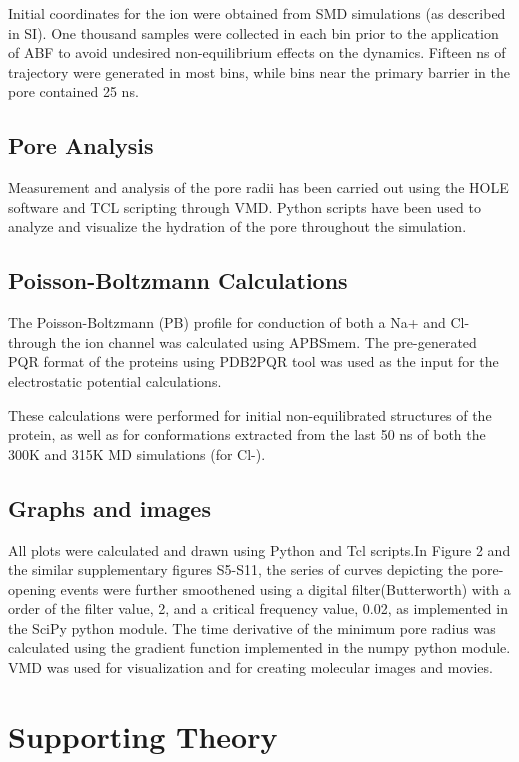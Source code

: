 \documentclass[9pt,onecolumn,oneside,lineno]{pnas-new}
\begin{document}
Initial coordinates for the ion were obtained from SMD simulations (as described in SI). One thousand samples were collected in each bin prior to the application of ABF  to avoid undesired non-equilibrium effects on the dynamics. Fifteen ns of trajectory were generated in most bins, while bins near the primary barrier in the pore contained 25 ns. 

\subsection*{Pore Analysis} Measurement and analysis of the pore radii has been carried out using the HOLE software \cite{Smart1996} and TCL scripting through VMD\cite{Humphrey1996a}. Python scripts have been used to analyze and visualize the hydration of the pore throughout the simulation. 

\subsection*{Poisson-Boltzmann Calculations} The Poisson-Boltzmann (PB) profile for conduction of both a Na+ and Cl- through the ion channel was calculated using APBSmem\cite{Callenberg2010}. The pre-generated PQR format of the proteins using PDB2PQR\cite{Dolinsky2007} tool was used as the input for the electrostatic potential calculations.

These calculations were performed for initial non-equilibrated structures of the protein, as well as for conformations extracted from the last 50 ns of both the 300K and 315K MD simulations (for Cl-). 

\subsection*{Graphs and images}
All plots were calculated and drawn using Python and Tcl scripts.In Figure 2 and the similar supplementary figures S5-S11, the series of curves depicting the pore-opening events were further smoothened using a digital filter(Butterworth) with a order of the filter value, 2, and a critical frequency value, 0.02,  as implemented in the SciPy python module. The time derivative of the minimum pore radius was calculated using the gradient function implemented in the numpy python module.
VMD\cite{Humphrey1996a} was used for visualization and for creating molecular images and movies.  

\section*{Supporting Theory}
\newcommand{\side}{r}
\newcommand{\diag}{s}
\end{document}
